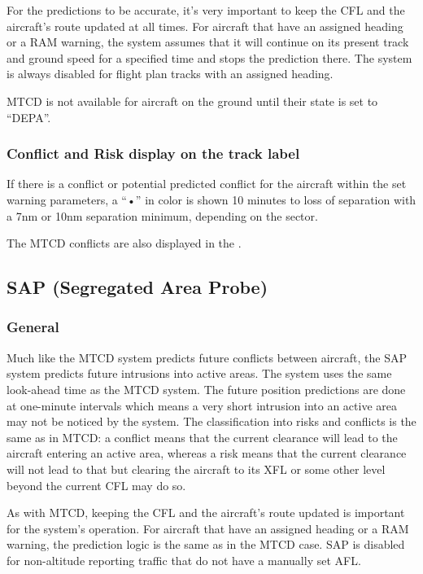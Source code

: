 \documentclass[a4paper,oneside,11pt]{memoir}
\begin{document}
For the predictions to be accurate, it’s very important to keep the CFL and the aircraft’s route updated at all times. For aircraft that have an assigned heading or a RAM warning, the system assumes that it will continue on its present track and ground speed for a specified time and stops the prediction there. The system is always disabled for flight plan tracks with an assigned heading.

\bigskip

MTCD is not available for aircraft on the ground until their state is set to “DEPA”.

\subsubsection*{Conflict and Risk display on the track label}

If there is a conflict or potential predicted conflict for the aircraft within the set warning parameters, a “•” in  color is shown 10 minutes to loss of separation with a 7nm or 10nm separation minimum, depending on the sector.

\bigskip

The MTCD conflicts are also displayed in the .

\subsection{SAP (Segregated Area Probe)}
\label{tool:SAP}
\subsubsection*{General}

Much like the MTCD system predicts future conflicts between aircraft, the SAP system predicts future intrusions into active areas. The system uses the same look-ahead time as the MTCD system. The future position predictions are done at one-minute intervals which means a very short intrusion into an active area may not be noticed by the system. The classification into risks and conflicts is the same as in MTCD: a conflict means that the current clearance will lead to the aircraft entering an active area, whereas a risk means that the current clearance will not lead to that but clearing the aircraft to its XFL or some other level beyond the current CFL may do so.

\bigskip

As with MTCD, keeping the CFL and the aircraft’s route updated is important for the system’s operation. For aircraft that have an assigned heading or a RAM warning, the prediction logic is the same as in the MTCD case. SAP is disabled for non-altitude reporting traffic that do not have a manually set AFL.
\end{document}
